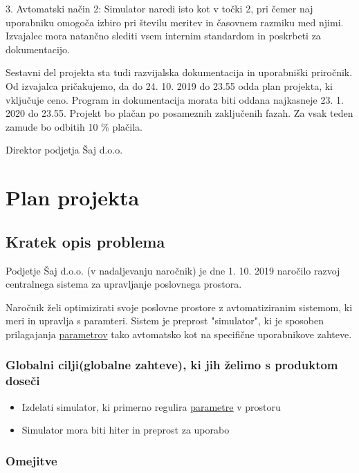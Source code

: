 \documentclass[a4paper,12pt]{article}
\begin{document}
	3. Avtomatski način 2: Simulator naredi isto kot v točki 2, pri čemer 
	naj uporabniku omogoča izbiro pri številu meritev in časovnem razmiku med njimi. 
	Izvajalec mora natančno slediti vsem internim standardom in poskrbeti za dokumentacijo. 
	
	Sestavni del projekta sta tudi razvijalska dokumentacija in uporabniški priročnik. 
	Od izvajalca pričakujemo, da do 24. 10. 2019 do 23.55 odda plan projekta, ki vključuje ceno. 
	Program in dokumentacija morata biti oddana najkasneje 23. 1. 2020 do 23.55. 
	Projekt bo plačan po posameznih zaključenih fazah. Za vsak teden zamude bo odbitih 10 \% plačila. 
	\\
	

	\hfill Direktor podjetja Šaj d.o.o.	

\newpage

\section{Plan projekta}

	\subsection{Kratek opis problema}

		\hspace{1em} Podjetje Šaj d.o.o. (v nadaljevanju naročnik) je dne 1. 10. 2019 naročilo 
		razvoj centralnega sistema za upravljanje poslovnega prostora.
		
		Naročnik želi optimizirati svoje poslovne prostore z avtomatiziranim sistemom, 
		ki meri in upravlja s paramteri. Sistem je preprost "simulator", ki je sposoben 
		prilagajanja \hyperlink{subsection.1.8}{\ul{parametrov}} tako avtomatsko kot na specifične uporabnikove zahteve.
		\subsubsection{Globalni cilji(globalne zahteve), ki jih želimo s produktom doseči}

		\begin{itemize}
				\item Izdelati simulator, ki primerno regulira {\hyperlink{subsection.1.8}{\ul{parametre}}} v prostoru
			\item Simulator mora biti hiter in preprost za uporabo
		\end{itemize}

		\subsubsection{Omejitve}
\end{document}
